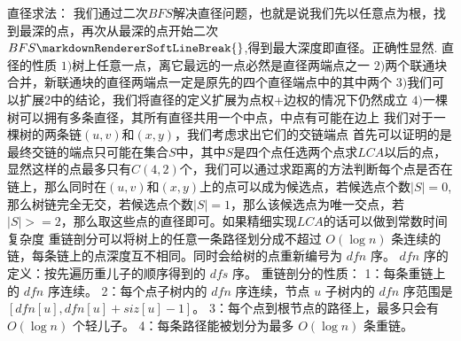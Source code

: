 {}
\markdownRendererSectionEnd \markdownRendererSectionBegin
{}\markdownRendererInterblockSeparator
{}直径求法：\markdownRendererParagraphSeparator
{}我们通过二次$ BFS $解决直径问题，也就是说我们先以任意点为根，找到最深的点，再次从最深的点开始二次$ BFS\markdownRendererSoftLineBreak
{}$,得到最大深度即直径。正确性显然.\markdownRendererInterblockSeparator
{}\markdownRendererInterblockSeparator
{}直径的性质\markdownRendererParagraphSeparator
{}$ 1) $树上任意一点，离它最远的一点必然是直径两端点之一\markdownRendererParagraphSeparator
{}$ 2) $两个联通块合并，新联通块的直径两端点一定是原先的四个直径端点中的其中两个\markdownRendererParagraphSeparator
{}$ 3) $我们可以扩展$ 2 $中的结论，我们将直径的定义扩展为点权+边权的情况下仍然成立\markdownRendererParagraphSeparator
{}$ 4) $一棵树可以拥有多条直径，其所有直径共用一个中点，中点有可能在边上\markdownRendererInterblockSeparator
{}
\markdownRendererSectionEnd \markdownRendererSectionBegin
{}\markdownRendererInterblockSeparator
{}我们对于一棵树的两条链$ (u,v) $和$ (x,y) $，我们考虑求出它们的交链端点\markdownRendererParagraphSeparator
{}首先可以证明的是 最终交链的端点只可能在集合$ S $中，其中$ S $是四个点任选两个点求$ LCA $以后的点，显然这样的点最多只有$ C(4,2) $个，我们可以通过求距离的方法判断每个点是否在链上，那么同时在$ (u,v) $和$ (x,y) $上的点可以成为候选点，若候选点个数$ |S|=0 $,那么树链完全无交，若候选点个数$ |S|=1 $，那么该候选点为唯一交点，若$ |S|>=2 $，那么取这些点的直径即可。如果精细实现$ LCA $的话可以做到常数时间复杂度\markdownRendererInterblockSeparator
{}\markdownRendererInterblockSeparator
{}
\markdownRendererSectionEnd \markdownRendererSectionBegin
{}\markdownRendererInterblockSeparator
{}重链剖分可以将树上的任意一条路径划分成不超过 $O(\log n)$ 条连续的链，每条链上的点深度互不相同。同时会给树的点重新编号为 $dfn$ 序。\markdownRendererParagraphSeparator
{}$dfn$ 序的定义：按先遍历重儿子的顺序得到的 $dfs$ 序。\markdownRendererParagraphSeparator
{}重链剖分的性质：\markdownRendererParagraphSeparator
{}1：每条重链上的 $dfn$ 序连续。\markdownRendererHardLineBreak
{}2：每个点子树内的 $dfn$ 序连续，节点 $u$ 子树内的 $dfn$ 序范围是 $[dfn[u], dfn[u] + siz[u] - 1]$。\markdownRendererHardLineBreak
{}3：每个点到根节点的路径上，最多只会有 $O(\log n)$ 个轻儿子。\markdownRendererHardLineBreak
{}4：每条路径能被划分为最多 $O(\log n)$ 条重链。\markdownRendererParagraphSeparator
